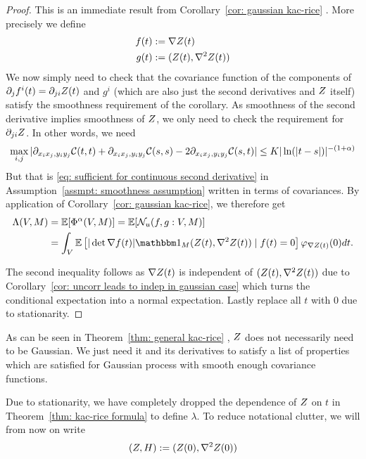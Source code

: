 \begin{proof}
	This is an immediate result from Corollary~\ref{cor: gaussian kac-rice}
	\parencite[Corollary~11.2.2]{adlerRandomFieldsGeometry2007}. More precisely
	we define
	\begin{align*}
		f(t) &:= \nabla Z(t)\\
		g(t) &:= (Z(t), \nabla^2 Z(t))
	\end{align*}
	We now simply need to check that the covariance function of the components of
	\(\partial_j f^i(t) = \partial_{ji} Z(t)\) and \(g^i\) (which are
	also just the second derivatives and \(Z\) itself) satisfy the smoothness
	requirement of the corollary. As smoothness of the second derivative implies
	smoothness of \(Z\), we only need to check the requirement for \(\partial_{ji} Z\).
	In other words, we need
	\[
		\max_{i,j}|\partial_{x_i x_j, y_i y_j}\mathcal{C}(t,t)
		+ \partial_{x_i x_j, y_i y_j}\mathcal{C}(s,s)
		-2\partial_{x_i x_j, y_i y_j}\mathcal{C}(s,t)| \le K |\ln(|t-s|)|^{-(1+\alpha)}
	\]
	But that is \eqref{eq: sufficient for continuous second derivative} in
	Assumption~\ref{assmpt: smoothness assumption} written in terms of
	covariances. By application
	of Corollary~\ref{cor: gaussian kac-rice}, we therefore get
	\begin{align*}
		\Lambda(\Vol, M) 
		&= \E[\crit^\alpha(\Vol, M)]
		= \E[\level(f, g: \Vol, M)]\\
		&= \int_\Vol \E\left[
			|\det \nabla f(t)| \ind_M(\rf(t), \nabla^2\rf(t)) \mid f(t) = 0
		\right] \density_{\nabla\rf(t)}(0)dt.
	\end{align*}
	
	
	The second inequality follows as \(\nabla Z(t)\) is independent of
	\((Z(t),\nabla^2Z(t))\) due to Corollary~\ref{cor: uncorr leads to indep
	in gaussian case} which turns the conditional expectation into a normal
	expectation. Lastly replace all \(t\) with \(0\) due to stationarity.
\end{proof}
\begin{remark}
	As can be seen in Theorem~\ref{thm: general kac-rice} \parencite[Theorem
	11.2.1]{adlerRandomFieldsGeometry2007}, \(Z\) does not necessarily
	need to be Gaussian. We just need it and its derivatives to satisfy a
	list of properties which are satisfied for Gaussian process with
	smooth enough covariance functions.
\end{remark}

Due to stationarity, we have completely dropped the dependence of \(Z\) on
\(t\) in Theorem~\ref{thm: kac-rice formula} to define \(\lambda\). To reduce
notational clutter, we will from now on write
\[
	(Z,H):= (Z(0), \nabla^2Z(0))
\]

